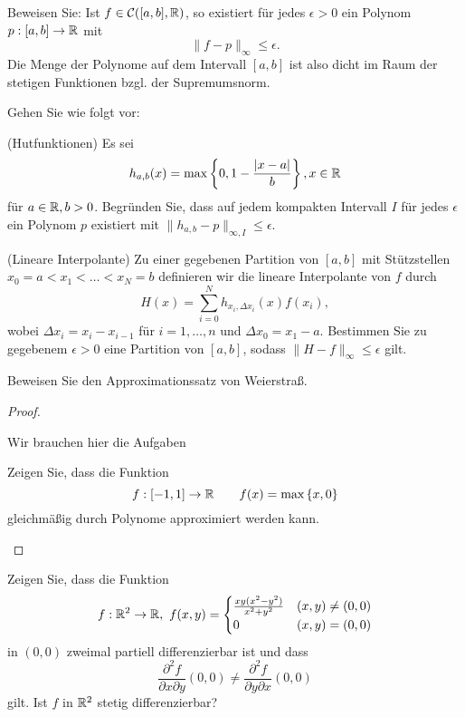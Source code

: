 \begin{Problem}
	Beweisen Sie: Ist $f\in \mathcal{C}([a,b],\mathbb{R})$, so existiert f\"{u}r jedes $\epsilon>0$ ein Polynom $p:[a,b]\to \mathbb{R}$ mit
	\[
	\|f-p\|_\infty\le\epsilon
	.\] 
	Die Menge der Polynome auf dem Intervall $[a,b]$ ist also dicht im Raum der stetigen Funktionen bzgl. der Supremumsnorm.

	Gehen Sie wie folgt vor:
	\begin{parts}
		\item (Hutfunktionen) Es sei
			\[
				h_{a,b}(x)=\max\left\{ 0,1-\frac{|x-a|}{b} \right\} ,x\in \mathbb{R}
			\]
			f\"{u}r $a\in \mathbb{R},b>0$. Begründen Sie, dass auf jedem kompakten Intervall $I$ f\"{u}r jedes $\epsilon$ ein Polynom $p$ existiert mit $\|h_{a,b}-p\|_{\infty,I}\le\epsilon$.
		\item (Lineare Interpolante) Zu einer gegebenen Partition von $[a,b]$ mit St\"{u}tzstellen $x_0=a<x_1<\dots<x_N=b$ definieren wir die lineare Interpolante von $f$ durch
			\[
				H(x)=\sum_{i=0}^N h_{x_i, \Delta x_i}(x)f(x_i)
			,\]
			wobei $\Delta x_i=x_i-x_{i-1}$ f\"{u}r $i=1,\dots, n$ und $\Delta x_0=x_1-a$. Bestimmen Sie zu gegebenem $\epsilon>0$ eine Partition von $[a,b]$, sodass $\|H-f\|_\infty\le\epsilon$ gilt.
		\item Beweisen Sie den Approximationssatz von Weierstraß. 
	\end{parts}
\end{Problem}
\begin{proof}
	\begin{parts}
	\item Wir brauchen hier die Aufgaben
		\begin{tcolorbox}
			Zeigen Sie, dass die Funktion
	\[f:[-1,1]\to\mathbb{R}\qquad f(x)=\text{max}\left\{ x,0 \right\} \]
	gleichmäßig durch Polynome approximiert werden kann.	
		\end{tcolorbox}
	\end{parts}
\end{proof}
\begin{Problem}
	Zeigen Sie, dass die Funktion
	\[
	f:\mathbb{R}^2\to\mathbb{R},~f(x,y)=\begin{cases}
		\frac{xy(x^2-y^2)}{x^2+y^2} & (x,y)\neq (0,0)\\
		0 & (x,y)=(0,0)
	\end{cases}
	\] 
	in $(0,0)$ zweimal partiell differenzierbar ist und dass
	\[
	\frac{\partial^2 f}{\partial x\partial y}(0,0)\neq \frac{\partial^2 f}{\partial y\partial x}(0,0)
\]
gilt. Ist $f$ in $\mathbb{R}^2$ stetig differenzierbar?
\end{Problem}
